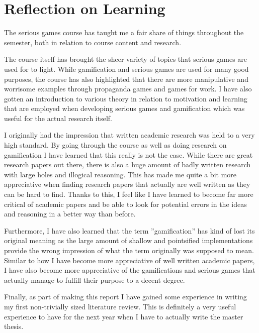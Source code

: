 \section{Reflection on Learning}
The serious games course has taught me a fair share of things throughout the semester, both in relation to course content and research. 

The course itself has brought the sheer variety of topics that serious games are used for to light. While gamification and serious games are used for many good purposes, the course has also highlighted that there are more manipulative and worrisome examples through propaganda games and games for work. I have also gotten an introduction to various theory in relation to motivation and learning that are employed when developing serious games and gamification which was useful for the actual research itself. 

I originally had the impression that written academic research was held to a very high standard. By going through the course as well as doing research on gamification I have learned that this really is not the case. While there are great research papers out there, there is also a huge amount of badly written research with large holes and illogical reasoning. This has made me quite a bit more appreciative when finding research papers that actually are well written as they can be hard to find. Thanks to this, I feel like I have learned to become far more critical of academic papers and be able to look for potential errors in the ideas and reasoning in a better way than before. 

Furthermore, I have also learned that the term ''gamification'' has kind of lost its original meaning as the large amount of shallow and pointsified implementations provide the wrong impression of what the term originally was supposed to mean. Similar to how I have become more appreciative of well written academic papers, I have also become more appreciative of the gamifications and serious games that actually manage to fulfill their purpose to a decent degree. 

Finally, as part of making this report I have gained some experience in writing my first non-trivially sized literature review. This is definitely a very useful experience to have for the next year when I have to actually write the master thesis. 
